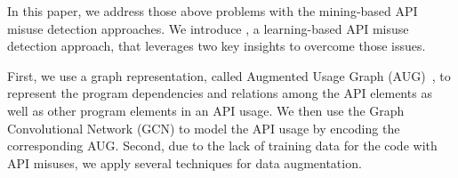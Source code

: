 
In this paper, we address those above problems with the mining-based
API misuse detection approaches. We introduce {\tool}, a
learning-based API misuse detection approach, that leverages two key
insights to overcome those issues.




First, we use a graph representation, called Augmented Usage Graph
(AUG)~\cite{mudetect-msr19}, to represent the program dependencies and
relations among the API elements as well as other program elements in
an API usage. We then use the Graph Convolutional Network (GCN) to
model the API usage by encoding the corresponding AUG. Second, due to
the lack of training data for the code with API misuses, we apply
several techniques for data augmentation.


